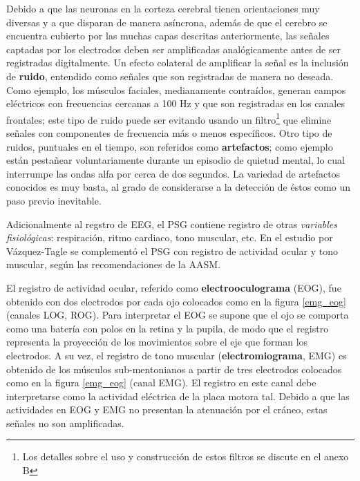 
Debido a que las neuronas en la corteza cerebral tienen orientaciones muy diversas y a que disparan 
de manera asíncrona, además de que el cerebro se encuentra cubierto por las muchas capas descritas
anteriormente, las señales captadas por los electrodos deben ser amplificadas analógicamente antes 
de ser registradas digitalmente.
%
%
Un efecto colateral de amplificar la señal es la inclusión de \textbf{ruido}, entendido como 
señales que son registradas de manera no deseada.
Como ejemplo, los músculos faciales, medianamente contraídos, generan campos eléctricos con
frecuencias cercanas a 100 Hz y que son registradas en los canales frontales;
este tipo de ruido puede ser evitando usando un filtro\footnote{Los detalles sobre el uso y
construcción de estos filtros se discute en el anexo B} que elimine señales con componentes de
frecuencia más o menos específicos.
Otro tipo de ruidos, puntuales en el tiempo, son referidos como \textbf{artefactos}; como ejemplo
están pestañear voluntariamente durante un episodio de quietud mental, lo cual interrumpe las ondas 
alfa por cerca de dos segundos.
La variedad de artefactos conocidos es muy basta, al grado de
considerarse a la detección de éstos como un paso previo inevitable.

Adicionalmente al regstro de EEG, el PSG contiene registro de otras \textit{variables fisiológicas}:
respiración, ritmo cardiaco, tono muscular, etc. En el estudio por Vázquez-Tagle se complementó el
PSG con registro de actividad ocular y tono muscular, según las recomendaciones de la AASM.

El registro de actividad ocular, referido como \textbf{electrooculograma} (EOG), fue obtenido
con dos electrodos por cada ojo colocados como en la figura \ref{emg_eog} 
(canales LOG, ROG).
Para interpretar el EOG
se supone que el ojo se comporta como una batería con polos en la retina y la pupila, de modo que
el registro representa la proyección de los movimientos sobre el eje que forman los electrodos. 
A su vez, el registro de
tono muscular (\textbf{electromiograma}, EMG) es obtenido de los músculos sub-mentonianos a partir 
de tres electrodos colocados como en la figura \ref{emg_eog} (canal EMG).
El registro en este canal debe interpretarse como la actividad eléctrica de la placa motora tal.
Debido a que las actividades en EOG y EMG no presentan la atenuación por el cráneo, estas señales
no son amplificadas.

